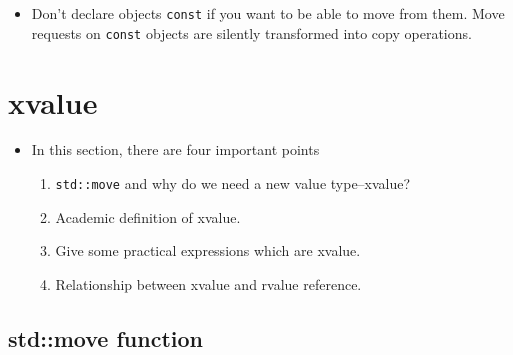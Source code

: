 \documentclass[a4paper,11pt,twoside]{book}
\begin{document}
\begin{itemize}
\item Don't declare objects \texttt{const} if you want to be able to move from them. Move requests on \texttt{const} objects are silently transformed into copy operations.

\end{itemize}

\section{xvalue}
\begin{itemize}
	\item In this section, there are four important points
	\begin{enumerate}
		\item \texttt{std::move} and why do we need a new value type--xvalue?
		\item Academic definition of xvalue.
		\item Give some practical expressions which are xvalue.
		\item Relationship between xvalue and rvalue reference.
	\end{enumerate}
\end{itemize}

\subsection{std::move function}
\end{document}

